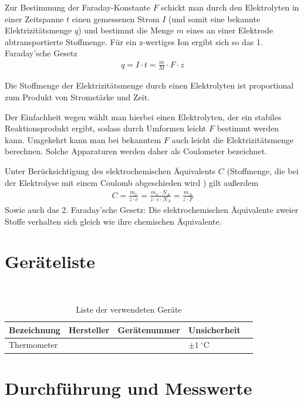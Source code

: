 \documentclass{article}
\begin{document}
Zur Bestimmung der Faraday-Konstante $F$ schickt man durch den Elektrolyten in einer Zeitspanne $t$ einen gemessenen Strom $I$ (und somit eine bekannte Elektrizitätsmenge $q$) und bestimmt die Menge $m$ eines an einer Elektrode abtransportierte Stoffmenge. Für ein z-wertiges Ion ergibt sich so das 1. Faraday'sche Gesetz
\begin{align}
q = I\cdot t = \frac{m}{M} \cdot F \cdot z
\end{align}



Die Stoffmenge der Elektrizitätsmenge durch einen Elektrolyten ist proportional zum Produkt von Stromstärke und Zeit.

Der Einfachheit wegen wählt man hierbei einen Elektrolyten, der ein stabiles Reaktionsprodukt ergibt, sodass durch Umformen leicht $F$ bestimmt werden kann. Umgekehrt kann man bei bekanntem $F$ auch leicht die Elektrizitätsmenge berechnen. Solche Apparaturen werden daher als Coulometer bezeichnet.

Unter Berücksichtigung des elektrochemischen Äquivalents $C$ (Stoffmenge, die bei der Elektrolyse mit einem Coulomb abgeschieden wird \cite{chemie}) gilt außerdem
\begin{align}
C = \frac{m_x}{z\cdot e} = \frac{m_x\cdot N_A}{z\cdot e \cdot N_A} = \frac{m_A}{z\cdot F}
\end{align}
Sowie auch das 2. Faraday'sche Gesetz: Die elektrochemischen Äquivalente zweier Stoffe verhalten sich gleich wie ihre chemischen Äquivalente.





\section{Geräteliste}

\begin{table}[H]
\caption{Liste der verwendeten Geräte}

~

\begin{tabular}{l|llll}
Bezeichnung & Hersteller & Gerätenummer & Unsicherheit \\
\hline
Thermometer & & & $\pm 1~^\circ$C \\
\end{tabular}

\end{table}




\section{Durchführung und Messwerte}
\end{document}
